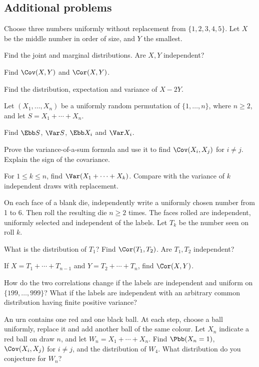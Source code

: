 \subsection*{Additional problems}
\begin{problembook}
Choose three numbers uniformly without replacement from $\{1,2,3,4,5\}$.
Let $X$ be the middle number in order of size, and $Y$ the smallest.
\begin{enumeratea}
  \item Find the joint and marginal distributions. Are $X,Y$ independent?
  \item Find $\Cov(X,Y)$ and $\Cor(X,Y)$.
  \item Find the distribution, expectation and variance of $X-2Y$.
\end{enumeratea}
\end{problembook}
\begin{problempencil}
Let $(X_1,\ldots,X_n)$ be a uniformly random permutation of $\{1,\ldots,n\}$,
where $n\ge2$, and let $S=X_1+\cdots+X_n$.
\begin{enumeratea}
  \item Find $\Ebb S$, $\Var S$, $\Ebb X_i$ and $\Var X_i$.
  \item Prove the variance-of-a-sum formula and use it to find $\Cov(X_i,X_j)$
  for $i\ne j$. Explain the sign of the covariance.
  \item For $1\le k\le n$, find $\Var(X_1+\cdots+X_k)$. Compare with the variance
  of $k$ independent draws with replacement.
\end{enumeratea}
\end{problempencil}
\begin{problempencil}
On each face of a blank die, independently write a uniformly chosen number from
1 to 6. Then roll the resulting die $n\ge2$ times. The faces rolled are independent,
uniformly selected and independent of the labels. Let $T_k$ be the number seen on roll $k$.
\begin{enumeratea}
  \item What is the distribution of $T_1$? Find $\Cor(T_1,T_2)$. Are $T_1,T_2$ independent?
  \item If $X=T_1+\cdots+T_{n-1}$ and $Y=T_2+\cdots+T_n$, find $\Cor(X,Y)$.
  \item How do the two correlations change if the labels are independent and uniform
  on $\{199,\ldots,999\}$? What if the labels are independent with an arbitrary
  common distribution having finite positive variance?
\end{enumeratea}
\end{problempencil}
\begin{problem}
An urn contains one red and one black ball. At each step, choose a ball uniformly,
replace it and add another ball of the same colour. Let $X_n$ indicate a red ball
on draw $n$, and let $W_n=X_1+\cdots+X_n$. Find $\Pbb(X_n=1)$, $\Cov(X_i,X_j)$
for $i\ne j$, and the distribution of $W_4$. What distribution do you conjecture for $W_n$?
\end{problem}
